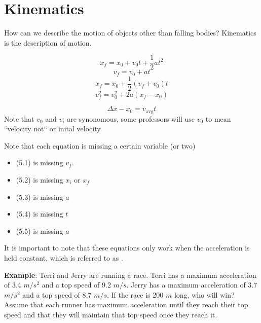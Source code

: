 \chapter{Kinematics}

How can we describe the motion of objects other than falling bodies? Kinematics 
is the description of motion. 



\begin{mdframed}[style=important]
\begin{equation}
    x_f = x_0 + v_0 t + \frac{1}{2}at^2
\end{equation}
\begin{equation}
    v_f = v_0 + at
\end{equation}
\begin{equation}
    x_f = x_0 + \frac{1}{2}\left(v_f + v_0 \right)t
\end{equation}
\begin{equation}
    v_f^2 = v_0^2 + 2a\left(x_f - x_0 \right)
\end{equation}

\begin{equation}
    \Delta x - x_0 = v_{\text{avg}}t
\end{equation}
Note that $v_0$ and $v_i$ are synonomous, some professors will use $v_0$ to mean ``velocity not`` or inital velocity.
\end{mdframed}




Note that each equation is missing a certain variable (or two)
\begin{itemize}
    \item (5.1) is missing $v_f$. 
    \item (5.2) is missing $x_i$ or $x_f$
    \item (5.3) is missing $a$
    \item (5.4) is missing $t$
    \item (5.5) is missing $a$
\end{itemize} 

It is important to note that these equations only work when the acceleration is held constant, which is referred to as . 

\textbf{Example}: Terri and Jerry are running a race. Terri has a maximum 
acceleration of 3.4 $m/s^2$ and a top speed of 9.2 $m/s$. Jerry has a maximum 
acceleration of 3.7 $m/s^2$ and a top speed of 8.7 $m/s$. If the race is 200 $m$ 
long, who will win? Assume that each runner has maximum acceleration until they 
reach their top speed and that they will maintain that top speed once they reach 
it. 

